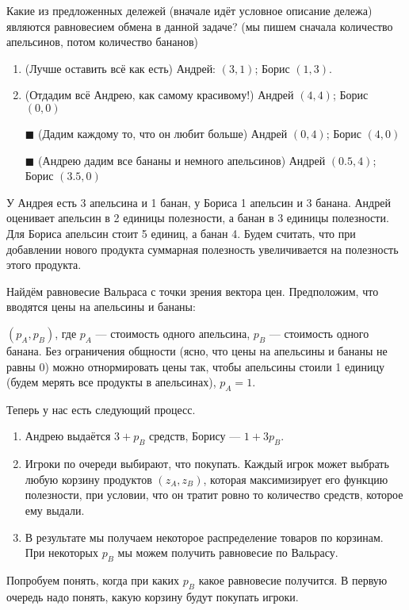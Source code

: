 Какие из предложенных дележей (вначале идёт условное описание дележа) являются равновесием обмена в данной задаче? (мы пишем сначала количество апельсинов, потом количество бананов)

\begin{enumerate}[label=$\square$] %
	\item (Лучше оставить всё как есть) Андрей: $(3,1)$; Борис $(1,3)$.
	\item (Отдадим всё Андрею, как самому красивому!) Андрей $(4,4)$; Борис $(0,0)$
	\item[$\blacksquare$] (Дадим каждому то, что он любит больше) Андрей $(0,4)$; Борис $(4,0)$
	\item[$\blacksquare$] (Андрею дадим все бананы и немного апельсинов) Андрей $(0.5,4)$; Борис $(3.5,0)$
\end{enumerate}

\task
У Андрея есть 3 апельсина и 1 банан, у Бориса 1 апельсин и 3 банана. Андрей оценивает апельсин в 2 единицы полезности, а банан в 3 единицы полезности. Для Бориса апельсин стоит 5 единиц, а банан 4. Будем считать, что при добавлении нового продукта суммарная полезность увеличивается на полезность этого продукта.

Найдём равновесие Вальраса с точки зрения вектора цен. Предположим, что вводятся цены на апельсины и бананы:

$(p_A,p_B)$, где $p_A$ --- стоимость одного апельсина, $p_B$ --- стоимость одного банана. Без ограничения общности (ясно, что цены на апельсины и бананы не равны 0) можно отнормировать цены так, чтобы апельсины стоили 1 единицу (будем мерять все продукты в апельсинах), $p_A=1$.

Теперь у нас есть следующий процесс.

\begin{enumerate}
	\item Андрею выдаётся $3+p_B$ средств, Борису --- $1+3p_B$.
	\item Игроки по очереди выбирают, что покупать. Каждый игрок может выбрать любую корзину продуктов $(z_A,z_B)$, которая максимизирует его функцию полезности, при условии, что он тратит ровно то количество средств, которое ему выдали.
	\item В результате мы получаем некоторое распределение товаров по корзинам. При некоторых $p_B$ мы можем получить равновесие по Вальрасу.
\end{enumerate}
	Попробуем понять, когда при каких $p_B$ какое равновесие получится. В первую очередь надо понять, какую корзину будут покупать игроки.
	
